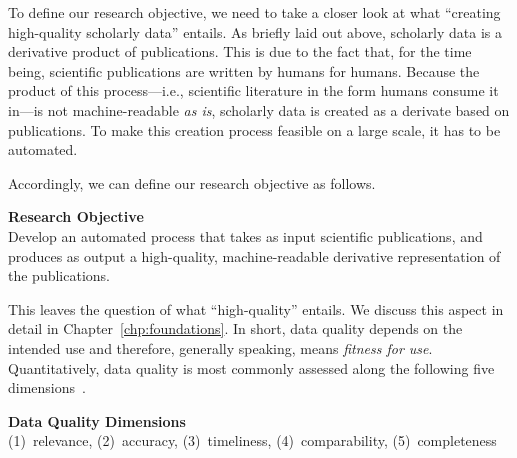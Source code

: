 
To define our research objective, we need to take a closer look at what ``creating high-quality scholarly data'' entails. As briefly laid out above, scholarly data is a derivative product of publications. This is due to the fact that, for the time being, scientific publications are written by humans for humans. Because the product of this process---i.e., scientific literature in the form humans consume it in---is not machine-readable \emph{as is}, scholarly data is created as a derivate based on publications. To make this creation process feasible on a large scale, it has to be automated.

Accordingly, we can define our research objective as follows.

\begin{infobox-objective}
\textbf{Research Objective}\\
Develop an automated process that takes as input scientific publications, and produces as output a high-quality, machine-readable derivative representation of the publications.
\end{infobox-objective}

This leaves the question of what ``high-quality'' entails. We discuss this aspect in detail in Chapter~\ref{chp:foundations}. In short, data quality depends on the intended use and therefore, generally speaking, means \emph{fitness for use}. Quantitatively, data quality is most commonly assessed along the following five dimensions~\cite{Herzog2007}.

\begin{infobox-progress}
      \textbf{Data Quality Dimensions}\\
       (1)~relevance, (2)~accuracy, (3)~timeliness, (4)~comparability, (5)~completeness
\end{infobox-progress}

